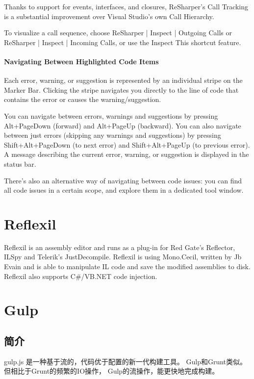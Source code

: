 \documentclass{book}
\begin{document}
Thanks to support for events, interfaces, and closures, 
ReSharper's Call Tracking is a substantial improvement over Visual Studio's own Call Hierarchy.

To visualize a call sequence, choose ReSharper | Inspect | Outgoing Calls or ReSharper | Inspect | Incoming Calls, 
or use the Inspect This shortcut feature.

\paragraph{Navigating Between Highlighted Code Items}Each error, warning, 
or suggestion is represented by an individual stripe on the Marker Bar. 
Clicking the stripe navigates you directly to the line of code that contains the error or causes the warning/suggestion.

You can navigate between errors, warnings and suggestions by pressing Alt+PageDown (forward) and Alt+PageUp (backward). 
You can also navigate between just errors (skipping any warnings and suggestions) by pressing Shift+Alt+PageDown (to next error) and Shift+Alt+PageUp (to previous error). 
A message describing the current error, warning, or suggestion is displayed in the status bar.

There's also an alternative way of navigating between code issues: 
you can find all code issues in a certain scope, and explore them in a dedicated tool window.

\section{Reflexil}

Reflexil is an assembly editor and runs as a plug-in for Red Gate's Reflector, 
ILSpy and Telerik's JustDecompile. 
Reflexil is using Mono.Cecil, 
written by Jb Evain and is able to manipulate IL code and save the modified assemblies to disk. Reflexil also supports C\#/VB.NET code injection.



\section{Gulp}

\subsection{简介}

gulp.js 是一种基于流的，代码优于配置的新一代构建工具。
Gulp和Grunt类似。但相比于Grunt的频繁的IO操作，
Gulp的流操作，能更快地完成构建。
\end{document}
